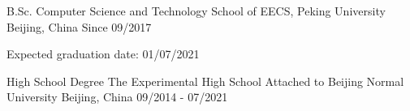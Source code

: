 

\begin{cventries}

  \cventry
    {B.Sc. Computer Science and Technology} %
    {School of EECS, Peking University} %
    {Beijing, China} %
    {Since 09/2017} %
    {
        \begin{cvitems}
        \item Expected graduation date: 01/07/2021
        \end{cvitems}
    }

  \cventry
    {High School Degree} %
    {The Experimental High School Attached to Beijing Normal University} %
    {Beijing, China} %
    {09/2014 - 07/2021} %
    {}
\end{cventries}
